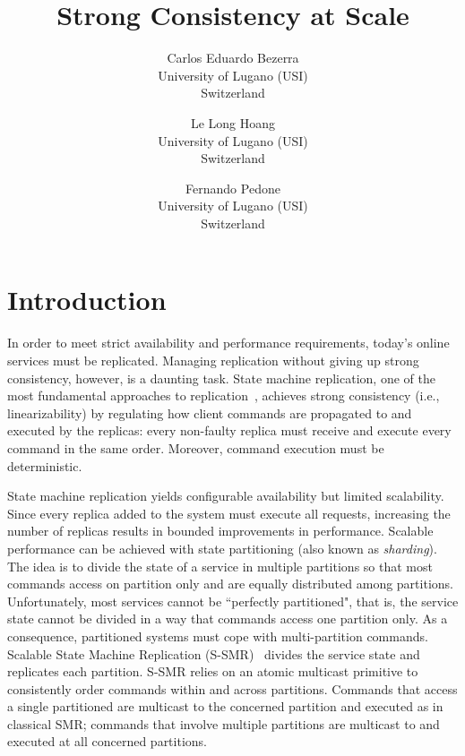 \documentclass[11pt]{article}
\begin{document}
\title{Strong Consistency at Scale}

\author{
  Carlos Eduardo Bezerra\\
  University of Lugano (USI)\\
  Switzerland
  \and
  Le Long Hoang\\
  University of Lugano (USI)\\
  Switzerland
  \and
  Fernando Pedone\\
  University of Lugano (USI)\\
  Switzerland
}

\begin{abstract}
\end{abstract}

\maketitle

\section{Introduction}

In order to meet strict availability and performance requirements, today's online services must be replicated.
Managing replication without giving up strong consistency, however, is a daunting task.
State machine replication, one of the most fundamental approaches to replication~\cite{Lam78,Sch90}, achieves strong consistency (i.e., linearizability) by regulating how client commands are propagated to and executed by the replicas: every non-faulty replica must receive and execute every command in the same order. Moreover, command execution must be deterministic. 

State machine replication yields configurable availability but limited scalability.
Since every replica added to the system must execute all requests, 
increasing the number of replicas results in bounded improvements in performance.
Scalable performance can be achieved with state partitioning (also known as \emph{sharding}).
The idea is to divide the state of a service in multiple partitions so that most commands access on partition only and are equally distributed among partitions. 
Unfortunately, most services cannot be ``perfectly partitioned", that is, the service state cannot be divided in a way that commands access one partition only.
As a consequence, partitioned systems must cope with multi-partition commands.
Scalable State Machine Replication (S-SMR)~\cite{bezerra2014ssmr} divides the service state and replicates each partition. 
S-SMR relies on an atomic multicast primitive to consistently order commands within and across partitions. 
Commands that access a single partitioned are multicast to the concerned partition and executed as in classical SMR;
commands that involve multiple partitions are multicast to and executed at all concerned partitions.
\end{document}
